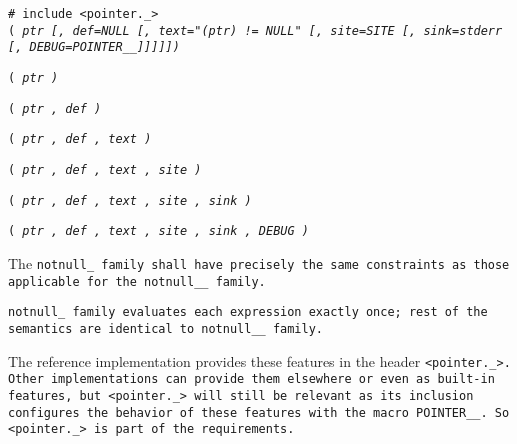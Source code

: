 
\tt{# include <pointer._>}\\

 \tt{(} \it{ptr}
[\tt{,} \it{def}\tt {=NULL}
[\tt{,} \it{text}\tt{="(}\it{ptr}\tt{) != NULL"}
[\tt{,} \it{site}\tt{=SITE}
[\tt{,} \it{sink}\tt{=stderr}
[\tt{,} \it{DEBUG}\tt{=POINTER__}]]]]]\tt{)}

 \tt{(}
\it{ptr}   \tt{)}

 \tt{(}
\it{ptr}   \tt{,}
\it{def}   \tt{)}

 \tt{(}
\it{ptr}   \tt{,}
\it{def}   \tt{,}
\it{text}  \tt{)}

 \tt{(}
\it{ptr}   \tt{,}
\it{def}   \tt{,}
\it{text}  \tt{,}
\it{site}  \tt{)}

 \tt{(}
\it{ptr}   \tt{,}
\it{def}   \tt{,}
\it{text}  \tt{,}
\it{site}  \tt{,}
\it{sink}  \tt{)}

 \tt{(}
\it{ptr}   \tt{,}
\it{def}   \tt{,}
\it{text}  \tt{,}
\it{site}  \tt{,}
\it{sink}  \tt{,}
\it{DEBUG} \tt{)}


The \tt{notnull_} family shall have precisely the same
constraints as those applicable for the \tt{notnull__} family.


\tt{notnull_} family evaluates each expression exactly once;
rest of the semantics are identical to  \tt{notnull__} family.

\note The reference implementation provides
these features in the header \tt{<pointer._>}.
Other implementations can provide them elsewhere or even as built-in features,
but \tt{<pointer._>} will still be relevant as its inclusion configures
the behavior of these features with the macro \tt{POINTER__}.
So \tt{<pointer._>} is part of the requirements.
